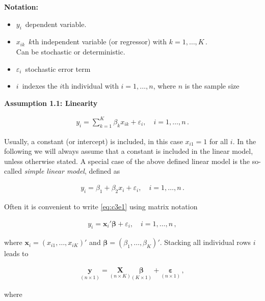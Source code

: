\documentclass[]{book}
\theoremstyle{definition}
\theoremstyle{definition}
\theoremstyle{definition}
\theoremstyle{remark}
\begin{document}
\textbf{Notation:}

\begin{itemize}
\item
  \(y_i \,\) dependent variable.
\item
  \(x_{ik} \,\) \(k\)th independent variable (or regressor) with
  \(k=1,\dots,K \,\).\\
  Can be stochastic or deterministic.
\item
  \(\varepsilon_i \,\) stochastic error term
\item
  \(i \,\) indexes the \(i\)th individual with \(i=1,\dots,n\), where \(n\) is
  the sample size
\end{itemize}

\textbf{Assumption 1.1: Linearity}

\[
\begin{align*}
y_i = \sum_{k=1}^K\beta_k x_{ik}+\varepsilon_i, \quad i=1,\dots,n \,.
\label{eq:c3e1}
\end{align*}
\]

Usually, a constant (or intercept) is included, in this case \(x_{i1}=1\) for all \(i\). In the following we will always assume that a constant is included in the linear model, unless otherwise stated. A special case of the above defined linear model is the so-called \emph{simple linear model}, defined as

\[
\begin{align*}
y_i = \beta_1+\beta_2 x_i +\varepsilon_i, \quad i=1,\dots,n \,.
\label{eq:c3e2}
\end{align*}
\]

Often it is convenient to write \eqref{eq:c3e1} using matrix notation

\[
\begin{align*}
y_i = \mathbf{x}_i'\boldsymbol{\beta} +\varepsilon_i, \quad i=1,\dots,n \,,
\label{eq:c3e3}
\end{align*}
\]

where \(\mathbf{x}_i=(x_{i1},\dots,x_{iK})'\) and \(\boldsymbol{\beta}=(\beta_1,\dots,\beta_K)'\). Stacking all individual rows \(i\) leads to

\[
\begin{align*}
\underset{(n\times 1)}{\mathbf{y}} = \underset{(n\times K)}{\mathbf{X}}\underset{(K\times 1)}{\boldsymbol{\beta}} + \underset{(n\times 1)}{\boldsymbol{\varepsilon}} \, ,
\end{align*}
\]

where
\end{document}
